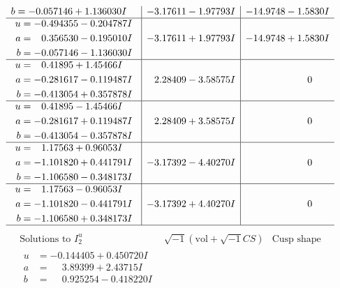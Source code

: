 \documentclass[1p]{elsarticle_modified}
\theoremstyle{definition}
\newcommand{\I}{\sqrt{-1}}
\begin{document}
$$\begin{array}{c|c|c}
\begin{aligned}
b &= -0.057146 + 1.136030 I\end{aligned}
 & -3.17611 - 1.97793 I & -14.9748 - 1.5830 I \\ \hline\begin{aligned}
u &= -0.494355 - 0.204787 I \\
a &= \phantom{-}0.356530 - 0.195010 I \\
b &= -0.057146 - 1.136030 I\end{aligned}
 & -3.17611 + 1.97793 I & -14.9748 + 1.5830 I \\ \hline\begin{aligned}
u &= \phantom{-}0.41895 + 1.45466 I \\
a &= -0.281617 - 0.119487 I \\
b &= -0.413054 + 0.357878 I\end{aligned}
 & \phantom{-}2.28409 - 3.58575 I & \phantom{-0.000000 } 0 \\ \hline\begin{aligned}
u &= \phantom{-}0.41895 - 1.45466 I \\
a &= -0.281617 + 0.119487 I \\
b &= -0.413054 - 0.357878 I\end{aligned}
 & \phantom{-}2.28409 + 3.58575 I & \phantom{-0.000000 } 0 \\ \hline\begin{aligned}
u &= \phantom{-}1.17563 + 0.96053 I \\
a &= -1.101820 + 0.441791 I \\
b &= -1.106580 - 0.348173 I\end{aligned}
 & -3.17392 - 4.40270 I & \phantom{-0.000000 } 0 \\ \hline\begin{aligned}
u &= \phantom{-}1.17563 - 0.96053 I \\
a &= -1.101820 - 0.441791 I \\
b &= -1.106580 + 0.348173 I\end{aligned}
 & -3.17392 + 4.40270 I & \phantom{-0.000000 } 0\\
 \hline 
 \end{array}$$\newpage$$\begin{array}{c|c|c}  
\text{Solutions to }I^u_{2}& \I (\text{vol} + \sqrt{-1}CS) & \text{Cusp shape}\\
 \hline 
\begin{aligned}
u &= -0.144405 + 0.450720 I \\
a &= \phantom{-}3.89399 + 2.43715 I \\
b &= \phantom{-}0.925254 - 0.418220 I\end{aligned}

\end{array}$$
\end{document}
